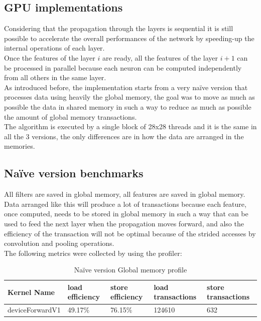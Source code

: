 \documentclass[a4paper]{report}
\begin{document}
\subsection{GPU implementations}
Considering that the propagation through the layers is sequential it is still possible to accelerate the overall performances of the network by speeding-up the internal operations of each layer.\\
Once the features of the layer \( i \) are ready, all the features of the layer \( i+1 \) can be processed in parallel because each neuron can be computed independently from all others in the same layer.\\
As introduced before, the implementation starts from a very naïve version that processes data using heavily the global memory, the goal was to move as much as possible the data in shared memory in such a way to reduce as much as possible the amount of global memory transactions.\\
The algorithm is executed by a single block of 28x28 threads and it is the same in all the 3 versions, the only differences are in how the data are arranged in the memories.

\subsection{Naïve version benchmarks}
All filters are saved in global memory, all features are saved in global memory.
Data arranged like this will produce a lot of transactions because each feature, once computed, needs to be stored in global memory in such a way that can be used to feed the next layer when the propagation moves forward, and also the efficiency of the transaction will not be optimal because of the strided accesses by convolution and pooling operations.\\
The following metrics were collected by using the profiler:

\begin{table}[!h]
\centering
\begin{tabular}{|l|l|l|l|l|}
\hline
\textbf{Kernel Name} & \textbf{load efficiency} & \textbf{store efficiency} & \textbf{load transactions} & \textbf{store transactions} \\ \hline
deviceForwardV1           & 49.17\%           & 76.15\%           & 124610           & 632       \\ \hline
\end{tabular}
\vspace*{3mm}
\caption{Naïve version Global memory profile}
\label{table:t1}
\end{table}
\end{document}
